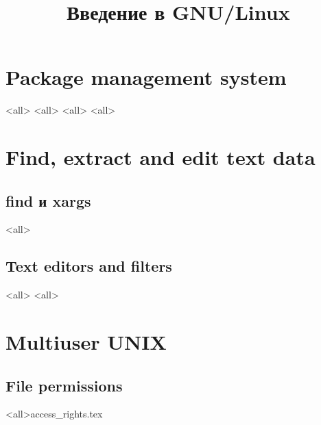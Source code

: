 

\title{Введение в GNU/Linux}








\begin{frame}
	\frametitle{}
	\titlepage
	\vspace{-0.5cm}
	\begin{center}
	\end{center}
\end{frame}




\section{Package management system}
\mode<all>{}
\mode<all>{}
\mode<all>{}
\mode<all>{}

\section{Find, extract and edit text data}

\subsection{find и xargs}
\mode<all>{}
\subsection{Text editors and filters}
\mode<all>{}
\mode<all>{} %


\section{Multiuser UNIX}
\subsection{File permissions}
\mode<all>{{access_rights.tex}}
